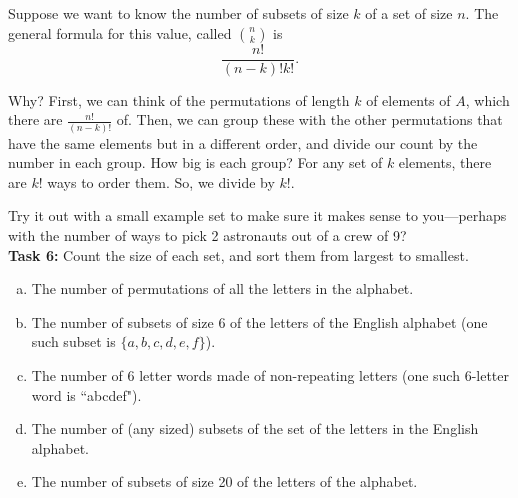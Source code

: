 \documentclass[12pt,letterpaper]{article}
\begin{document}
	Suppose we want to know the number of subsets of size $k$ of a set of size $n$. The general formula for this value, called $\binom{n}{k}$ is $$\frac{n!}{(n-k)!k!}.$$
	
	Why? First, we can think of the permutations of length $k$ of elements of $A$, which there are $\frac{n!}{(n-k)!}$ of. Then, we can group these with the other permutations that have the same elements but in a different order, and divide our count by the number in each group. How big is each group? For any set of $k$ elements, there are $k!$ ways to order them. So, we divide by $k!$.
	
	Try it out with a small example set to make sure it makes sense to you---perhaps with the number of ways to pick 2 astronauts out of a crew of 9?\\
	
	\textbf{Task 6: }Count the size of each set, and sort them from largest to smallest. 
	\begin{enumerate}[a.]
	    \item The number of permutations of all the letters in the alphabet.
	    \item The number of subsets of size 6 of the letters of the English alphabet (one such subset is $\{a, b, c, d, e, f\}$).
	    \item The number of 6 letter words made of non-repeating letters (one such 6-letter word is ``abcdef").
	    \item The number of (any sized) subsets of the set of the letters in the English alphabet. 
	    \item The number of subsets of size 20 of the letters of the alphabet. 
	\end{enumerate}
	\begin{mdframed} \vspace{4cm} \end{mdframed}
\end{document}
